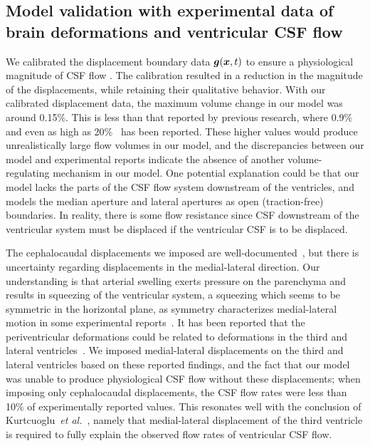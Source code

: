 \documentclass{template}
\begin{document}
\subsection{Model validation with experimental data of brain deformations and ventricular CSF flow}
We calibrated the displacement boundary data $\bm{g}(\bm{x}, t)$
to ensure a physiological magnitude of CSF flow
\citep{eide2021direction,wagshul2011pulsating}.
The calibration resulted in a reduction in the magnitude of the displacements,
while retaining their qualitative behavior. With our calibrated displacement data,
the maximum volume change in our model was around 0.15\%.
This is less than that reported by previous research,
where 0.9\%~\citep{zhu2006dynamics} and even as high as 20\%~\citep{lee1989variation}
has been reported. These higher values would produce unrealistically large flow
volumes in our model, and the discrepancies between our model and
experimental reports indicate the absence of another
volume-regulating mechanism in our model. One potential explanation could be
that our model lacks the parts of the CSF flow system downstream
of the ventricles, and models the median aperture and lateral apertures as 
open (traction-free) boundaries. In reality, there is some flow resistance
since CSF downstream of the ventricular system must be displaced
if the ventricular CSF is to be displaced. 

The cephalocaudal displacements we imposed are
well-documented~\citep{Kurtcuoglu2007ComputationalSylvius,
Enzmann1992BrainImaging, greitz1992pulsatile, soellinger2007assessment, soellinger20093d},
but there is uncertainty regarding displacements 
in the medial-lateral direction. Our understanding is
that arterial swelling exerts pressure on the parenchyma and results in
squeezing of the ventricular system, a squeezing which seems to be symmetric
in the horizontal plane, as symmetry characterizes medial-lateral motion
in some experimental reports~\citep{soellinger20093d, abderezaei2021development}.
It has been reported that the periventricular deformations could be related to
deformations in the third and lateral ventricles~\citep{abderezaei2021development}.
We imposed medial-lateral displacements on the third and lateral 
ventricles based on these reported findings, and the fact that our model
was unable to produce physiological CSF flow without these displacements;
when imposing only cephalocaudal displacements, the CSF flow rates were less than
10\% of experimentally reported values. This resonates well with the conclusion of
Kurtcuoglu~\emph{et al.}~\citep{Kurtcuoglu2007ComputationalSylvius},
namely that medial-lateral displacement of the third ventricle is
required to fully explain the observed flow rates of ventricular CSF flow.
\end{document}
